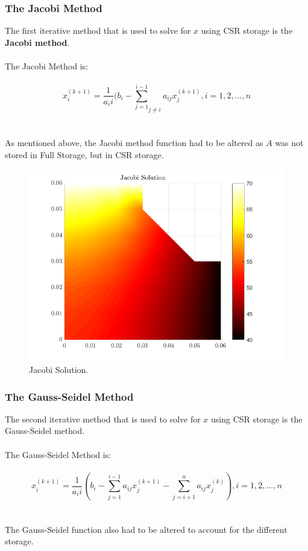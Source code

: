 \documentclass[12pt,a4paper]{article}
\begin{document}
\subsubsection{The Jacobi Method}
The first iterative method that is used to solve for $x$ using CSR storage is the \textbf{Jacobi method}.
\\\\
The Jacobi Method is:
\\\\
$$x_{i}^{(k+1)} = \frac{1}{a_ii}(b_i-{\sum_{j=1}^{i-1}}_{j\neq i}a_{ij}x_{j}^{(k+1)}, i = 1, 2, ..., n$$
\\\\
As mentioned above, the Jacobi method function had to be altered as $A$ was not stored in Full Storage, but in CSR storage. 
\begin{figure}[H]
	\includegraphics[width=\linewidth]{images/jacobisolution.png}
	\caption{Jacobi Solution.}
	\label{fig:jacobi}
\end{figure}

\subsubsection{The Gauss-Seidel Method}
The second iterative method that is used to solve for $x$ using CSR storage is the Gauss-Seidel method.
\\\\
The Gauss-Seidel Method is:
\\\\
$$x_{i}^{(k+1)} = \frac{1}{a_ii}(b_i-\sum_{j=1}^{i-1}a_{ij}x_{j}^{(k+1)}-\sum_{j=i+1}^{n}a_{ij}x_{j}^{(k)}), i = 1, 2, ..., n$$
\\\\
The Gauss-Seidel function also had to be altered to account for the different storage. 
\end{document}
